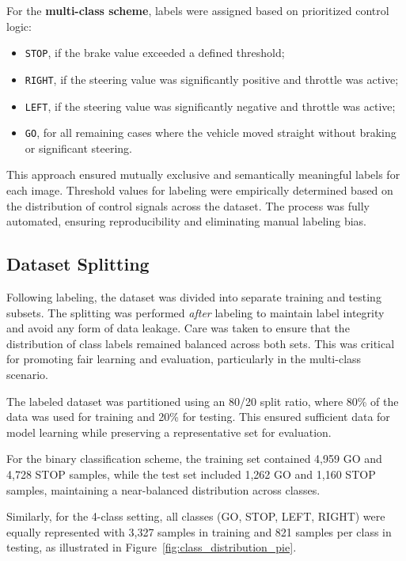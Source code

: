 For the \textbf{multi-class scheme}, labels were assigned based on prioritized control logic:
\begin{itemize}
    \item \texttt{STOP}, if the brake value exceeded a defined threshold;
    \item \texttt{RIGHT}, if the steering value was significantly positive and throttle was active;
    \item \texttt{LEFT}, if the steering value was significantly negative and throttle was active;
    \item \texttt{GO}, for all remaining cases where the vehicle moved straight without braking or significant steering.
\end{itemize}

This approach ensured mutually exclusive and semantically meaningful labels for each image. Threshold values for labeling were empirically determined based on the distribution of control signals across the dataset. The process was fully automated, ensuring reproducibility and eliminating manual labeling bias.

\subsection{Dataset Splitting}

Following labeling, the dataset was divided into separate training and testing subsets. The splitting was performed \textit{after} labeling to maintain label integrity and avoid any form of data leakage. Care was taken to ensure that the distribution of class labels remained balanced across both sets. This was critical for promoting fair learning and evaluation, particularly in the multi-class scenario.

The labeled dataset was partitioned using an 80/20 split ratio, where 80\% of the data was used for training and 20\% for testing. This ensured sufficient data for model learning while preserving a representative set for evaluation.

For the binary classification scheme, the training set contained 4,959 GO and 4,728 STOP samples, while the test set included 1,262 GO and 1,160 STOP samples, maintaining a near-balanced distribution across classes.

Similarly, for the 4-class setting, all classes (GO, STOP, LEFT, RIGHT) were equally represented with 3,327 samples in training and 821 samples per class in testing, as illustrated in Figure~\ref{fig:class_distribution_pie}.

